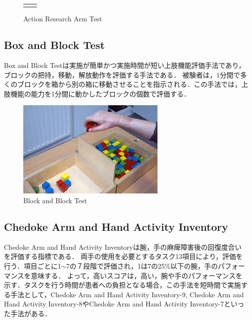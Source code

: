 \begin{figure}[H]
\begin{center}
\begin{tabular}{cc}
{} \\
\end{tabular}
\end{center}
   \caption{Action Research Arm Test\cite{Hsieh2009}}
\label{fig:ARAT}
\end{figure}


\subsection*{Box and Block Test}
Box and Block Test\cite{T.2005,Mathiowetz1985,Desrosiers1993,Lin2010}は実施が簡単かつ実施時間が短い上肢機能評価手法であり，ブロックの把持，移動，解放動作を評価する手法である．
被験者は，1分間で多くのブロックを箱から別の箱に移動させることを指示される．この手法では，上肢機能の能力を1分間に動かしたブロックの個数で評価する．
\begin{figure}[H]
  \centering
  \includegraphics[width=0.8\linewidth]{fig/ch1/babt}
  \caption{Block and Block Test\cite{T.2005}}
  \label{fig:babt}
\end{figure}

\subsection*{Chedoke Arm and Hand Activity Inventory}
Chedoke Arm and Hand Activity Inventory\cite{Barreca2004,Barreca2006,Barreca2005,Johnson2017}は腕，手の麻痺障害後の回復度合いを評価する指標である．
両手の使用を必要とするタスク13項目により，評価を行う．項目ごとに1$\sim$7の７段階で評価され，1は7の25\%以下の腕，手のパフォーマンスを意味する．
よって，高いスコアは，高い，腕や手のパフォーマンスを示す．タスクを行う時間が患者への負担となる場合，この手法を短時間で実施する手法として，Chedoke Arm and Hand Activity Inventory-9, Chedoke Arm and Hand Activity Inventory-8やChedoke Arm and Hand Activity Inventory-7といった手法がある．

